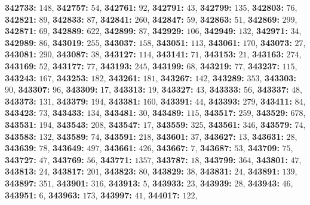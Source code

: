\textsf{\bfseries 342733:} $148$, \textsf{\bfseries 342757:} $54$, \textsf{\bfseries 342761:} $92$, \textsf{\bfseries 342791:} $43$, \textsf{\bfseries 342799:} $135$, \textsf{\bfseries 342803:} $76$, \textsf{\bfseries 342821:} $89$, \textsf{\bfseries 342833:} $87$, \textsf{\bfseries 342841:} $260$, \textsf{\bfseries 342847:} $59$, \textsf{\bfseries 342863:} $51$, \textsf{\bfseries 342869:} $299$, \textsf{\bfseries 342871:} $69$, \textsf{\bfseries 342889:} $622$, \textsf{\bfseries 342899:} $87$, \textsf{\bfseries 342929:} $106$, \textsf{\bfseries 342949:} $132$, \textsf{\bfseries 342971:} $34$, \textsf{\bfseries 342989:} $86$, \textsf{\bfseries 343019:} $255$, \textsf{\bfseries 343037:} $158$, \textsf{\bfseries 343051:} $113$, \textsf{\bfseries 343061:} $170$, \textsf{\bfseries 343073:} $27$, \textsf{\bfseries 343081:} $290$, \textsf{\bfseries 343087:} $38$, \textsf{\bfseries 343127:} $114$, \textsf{\bfseries 343141:} $71$, \textsf{\bfseries 343153:} $21$, \textsf{\bfseries 343163:} $274$, \textsf{\bfseries 343169:} $52$, \textsf{\bfseries 343177:} $77$, \textsf{\bfseries 343193:} $245$, \textsf{\bfseries 343199:} $68$, \textsf{\bfseries 343219:} $77$, \textsf{\bfseries 343237:} $115$, \textsf{\bfseries 343243:} $167$, \textsf{\bfseries 343253:} $182$, \textsf{\bfseries 343261:} $181$, \textsf{\bfseries 343267:} $142$, \textsf{\bfseries 343289:} $353$, \textsf{\bfseries 343303:} $90$, \textsf{\bfseries 343307:} $96$, \textsf{\bfseries 343309:} $17$, \textsf{\bfseries 343313:} $19$, \textsf{\bfseries 343327:} $43$, \textsf{\bfseries 343333:} $56$, \textsf{\bfseries 343337:} $48$, \textsf{\bfseries 343373:} $131$, \textsf{\bfseries 343379:} $194$, \textsf{\bfseries 343381:} $160$, \textsf{\bfseries 343391:} $44$, \textsf{\bfseries 343393:} $279$, \textsf{\bfseries 343411:} $84$, \textsf{\bfseries 343423:} $73$, \textsf{\bfseries 343433:} $134$, \textsf{\bfseries 343481:} $30$, \textsf{\bfseries 343489:} $115$, \textsf{\bfseries 343517:} $259$, \textsf{\bfseries 343529:} $678$, \textsf{\bfseries 343531:} $194$, \textsf{\bfseries 343543:} $208$, \textsf{\bfseries 343547:} $17$, \textsf{\bfseries 343559:} $325$, \textsf{\bfseries 343561:} $346$, \textsf{\bfseries 343579:} $74$, \textsf{\bfseries 343583:} $132$, \textsf{\bfseries 343589:} $74$, \textsf{\bfseries 343591:} $218$, \textsf{\bfseries 343601:} $37$, \textsf{\bfseries 343627:} $13$, \textsf{\bfseries 343631:} $28$, \textsf{\bfseries 343639:} $78$, \textsf{\bfseries 343649:} $497$, \textsf{\bfseries 343661:} $426$, \textsf{\bfseries 343667:} $7$, \textsf{\bfseries 343687:} $53$, \textsf{\bfseries 343709:} $75$, \textsf{\bfseries 343727:} $47$, \textsf{\bfseries 343769:} $56$, \textsf{\bfseries 343771:} $1357$, \textsf{\bfseries 343787:} $18$, \textsf{\bfseries 343799:} $364$, \textsf{\bfseries 343801:} $47$, \textsf{\bfseries 343813:} $24$, \textsf{\bfseries 343817:} $201$, \textsf{\bfseries 343823:} $80$, \textsf{\bfseries 343829:} $38$, \textsf{\bfseries 343831:} $24$, \textsf{\bfseries 343891:} $139$, \textsf{\bfseries 343897:} $351$, \textsf{\bfseries 343901:} $316$, \textsf{\bfseries 343913:} $5$, \textsf{\bfseries 343933:} $23$, \textsf{\bfseries 343939:} $28$, \textsf{\bfseries 343943:} $46$, \textsf{\bfseries 343951:} $6$, \textsf{\bfseries 343963:} $173$, \textsf{\bfseries 343997:} $41$, \textsf{\bfseries 344017:} $122$, 
